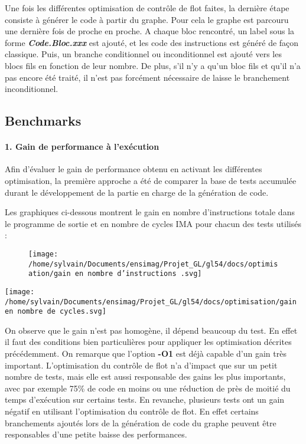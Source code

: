 \documentclass[
]{article}
\begin{document}
\begin{itemize}
  Une fois les différentes optimisation de contrôle de flot faites, la
  dernière étape consiste à générer le code à partir du graphe. Pour
  cela le graphe est parcouru une dernière fois de proche en proche. A
  chaque bloc rencontré, un label sous la forme
  \emph{\textbf{Code.Bloc.xxx}} est ajouté, et les code des instructions
  est généré de façon classique. Puis, un branche conditionnel ou
  inconditionnel est ajouté vers les blocs fils en fonction de leur
  nombre. De plus, s'il n'y a qu'un bloc fils et qu'il n'a pas encore
  été traité, il n'est pas forcément nécessaire de laisse le branchement
  inconditionnel.
\end{itemize}

\hypertarget{benchmarks}{%
\subsection{Benchmarks}\label{benchmarks}}

\hypertarget{1--gain-de-performance-uxe0-lexuxe9cution}{%
\paragraph{1. Gain de performance à
l'exécution}\label{1--gain-de-performance-uxe0-lexuxe9cution}}

Afin d'évaluer le gain de performance obtenu en activant les différentes
optimisation, la première approche a été de comparer la base de tests
accumulée durant le développement de la partie en charge de la
génération de code.

Les graphiques ci-dessous montrent le gain en nombre d'instructions
totale dans le programme de sortie et en nombre de cycles IMA pour
chacun des tests utilisés :

\begin{figure}
\centering
\texttt{[image: /home/sylvain/Documents/ensimag/Projet\_GL/gl54/docs/optimisation/gain en nombre d'instructions .svg]}
\caption{}
\end{figure}

\texttt{[image: /home/sylvain/Documents/ensimag/Projet\_GL/gl54/docs/optimisation/gain en nombre de cycles.svg]}

On observe que le gain n'est pas homogène, il dépend beaucoup du test.
En effet il faut des conditions bien particulières pour appliquer les
optimisation décrites précédemment. On remarque que l'option
\textbf{-O1} est déjà capable d'un gain très important. L'optimisation
du contrôle de flot n'a d'impact que sur un petit nombre de tests, mais
elle est aussi responsable des gains les plus importants, avec par
exemple 75\% de code en moins ou une réduction de près de moitié du
temps d'exécution sur certains tests. En revanche, plusieurs tests ont
un gain négatif en utilisant l'optimisation du contrôle de flot. En
effet certains branchements ajoutés lors de la génération de code du
graphe peuvent être responsables d'une petite baisse des performances.
\end{document}
